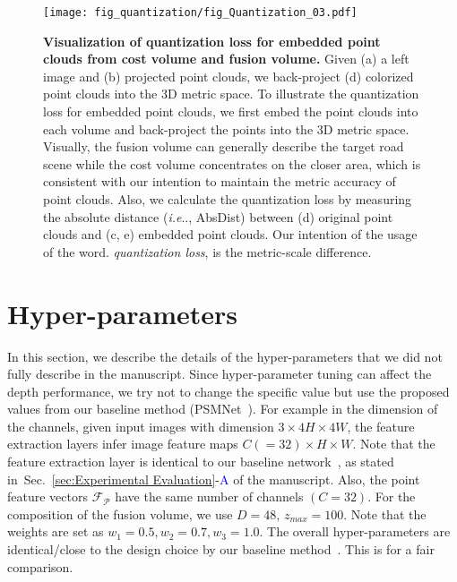 \documentclass[letterpaper, 10 pt, conference]{ieeeconf}
\makeatletter
\DeclareRobustCommand\onedot{\futurelet\@let@token\@onedot}
\def\@onedot{\ifx\@let@token.\else.\null\fi\xspace}
\def\ie{\emph{i.e}\onedot} \def\Ie{{I.e}\onedot}
\newcommand{\Sref}[1]{Sec.~\textcolor{blue}{\ref{#1}}}
\makeatother
\begin{document}
\begin{figure*}[!t]
\centering
\texttt{[image: fig\_quantization/fig\_Quantization\_03.pdf]}
\vspace{-4mm}
\caption{\textbf{Visualization of quantization loss for embedded point clouds from cost volume and fusion volume.} Given (a) a left image and (b) projected point clouds, we back-project (d) colorized point clouds into the 3D metric space. 
To illustrate the quantization loss for embedded point clouds, we first embed the point clouds into each volume and back-project the points into the 3D metric space. 
Visually, the fusion volume can generally describe the target road scene while the cost volume concentrates on the closer area, which is consistent with our intention to maintain the metric accuracy of point clouds.
Also, we calculate the quantization loss by measuring the absolute distance (\ie, AbsDist) between (d) original point clouds and (c, e) embedded point clouds. 
Our intention of the usage of the word. \textit{quantization loss}, is the metric-scale difference.} 
\label{fig:quantization}
\end{figure*}




\section{Hyper-parameters}
\label{supp-sec:Hyper-parameters}

In this section, we describe the details of the hyper-parameters that we did not fully describe in the manuscript. Since hyper-parameter tuning can affect the depth performance, we try not to change the specific value but use the proposed values from our baseline method (PSMNet~\cite{psmnet}). For example in the dimension of the channels, given input images with dimension $3 \times 4H \times 4W$, the feature extraction layers infer image feature maps $C({=}32) \times H \times W$. Note that the feature extraction layer is identical to our baseline network~\cite{psmnet}, as stated in~\Sref{sec:Experimental Evaluation}-\textcolor{blue}{A} of the manuscript. Also, the point feature vectors $\mathcal{F}_{\mathcal{P}}$ have the same number of channels $(C{=}32)$. For the composition of the fusion volume, we use $D{=}48$, $z_{max}{=}100$. 
Note that the weights are set as $w_{1}{=}0.5, w_{2}{=}0.7, w_{3}{=}1.0$. The overall hyper-parameters are identical/close to the design choice by our baseline method~\cite{psmnet}. This is for a fair comparison.
\end{document}
